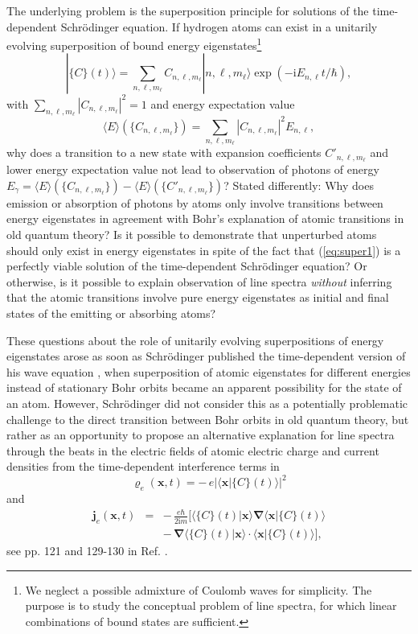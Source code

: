 \documentclass[final,3p,times,twocolumn]{elsarticle3}
\begin{document}
The underlying problem is the superposition principle for solutions of the 
time-dependent Schr\"odinger equation. If hydrogen atoms can exist in a 
unitarily evolving superposition of bound energy 
eigenstates\footnote{We neglect a possible admixture of Coulomb waves for
simplicity. The purpose is to study the conceptual problem of line
spectra, for which linear combinations of bound states are sufficient.}
\begin{equation}\label{eq:super1}
|\{C\}(t)\rangle=\sum_{n,\ell,m_\ell}C_{n,\ell,m_\ell}|n,\ell,m_\ell\rangle
\exp(-\mathrm{i}E_{n,\ell}t/\hbar),
\end{equation}
with $\sum_{n,\ell,m_\ell}|C_{n,\ell,m_\ell}|^2=1$ and energy expectation value
\[
\langle E\rangle(\{C_{n,\ell,m_\ell}\})
=\sum_{n,\ell,m_\ell}|C_{n,\ell,m_\ell}|^2E_{n,\ell},
\]
why does a transition to a new state with expansion coefficients $C'_{n,\ell,m_\ell}$
and lower energy expectation value not lead to observation of photons of energy
$E_\gamma=\langle E\rangle(\{C_{n,\ell,m_\ell}\})-\langle E\rangle(\{C'_{n,\ell,m_\ell}\})$?
Stated differently: Why does emission or absorption of photons by atoms only 
involve transitions between energy eigenstates in agreement with Bohr's explanation
of atomic transitions in old quantum theory? 
Is it possible to demonstrate that unperturbed atoms should only exist in energy
eigenstates in spite of the fact that (\ref{eq:super1}) is a perfectly viable
solution of the time-dependent Schr\"odinger equation?
Or otherwise, is it possible to explain 
observation of line spectra \textit{without} inferring that the atomic transitions 
involve pure energy eigenstates as initial and final states of the emitting or 
absorbing atoms?

These questions about the role of unitarily evolving superpositions of energy
eigenstates arose as soon as Schr\"odinger published the time-dependent version of 
his wave equation \cite{erwin}, when superposition of atomic eigenstates for 
different energies instead of stationary Bohr orbits became an apparent possibility for 
the state of an atom. However, Schr\"odinger did not consider this as a potentially 
problematic challenge to the direct transition between Bohr orbits in old quantum 
theory, but rather as an opportunity to propose an alternative explanation for line 
spectra through the beats in the electric fields of atomic electric charge and current 
densities from the time-dependent interference terms in
\[
\varrho_e(\bm{x},t)=-\,e|\langle\bm{x}|\{C\}(t)\rangle|^2
\]
and
\begin{eqnarray}\nonumber
\bm{j}_e(\bm{x},t)&=&-\,\frac{e\hbar}{2\mathrm{i}m}[
\langle\{C\}(t)|\bm{x}\rangle\bm{\nabla}\langle\bm{x}|\{C\}(t)\rangle
\\ \label{eq:je}
&&-\,\bm{\nabla}\langle\{C\}(t)|\bm{x}\rangle\cdot\langle\bm{x}|\{C\}(t)\rangle],
\end{eqnarray}
see pp. 121 and 129-130 in Ref. \cite{erwin}. 
\end{document}
